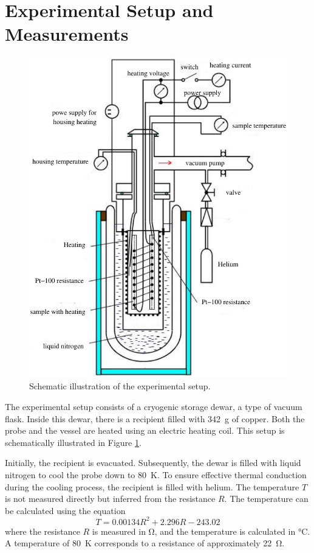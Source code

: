 \section{Experimental Setup and Measurements}
\label{sec:procedure}
\begin{figure}
    \centering
    \includegraphics[width=\textwidth]{pictures/setup.png}
    \caption{Schematic illustration of the experimental setup. \cite{V47}}
    \label{fig:setup}
\end{figure}

The experimental setup consists of a cryogenic storage dewar, a type of vacuum flask. 
Inside this dewar, there is a recipient filled with \SI{342}{\gram} of copper. 
Both the probe and the vessel are heated using an electric heating coil. 
This setup is schematically illustrated in Figure \ref{fig:setup}.

Initially, the recipient is evacuated. 
Subsequently, the dewar is filled with liquid nitrogen to cool the probe 
down to \SI{80}{\kelvin}. 
To ensure effective thermal conduction during the cooling process, 
the recipient is filled with helium. 
The temperature $T$ is not measured directly but inferred from the resistance $R$. 
The temperature can be calculated using the equation
\begin{equation}
    T=\num{0.00134}R^2+\num{2.296}R-243.02 
\end{equation}
where the resistance $R$ is measured in \si{\ohm}, and the temperature is 
calculated in \si{\celsius}.
A temperature of \SI{80}{\kelvin} corresponds to a resistance of approximately 
\SI{22}{\ohm}. 


